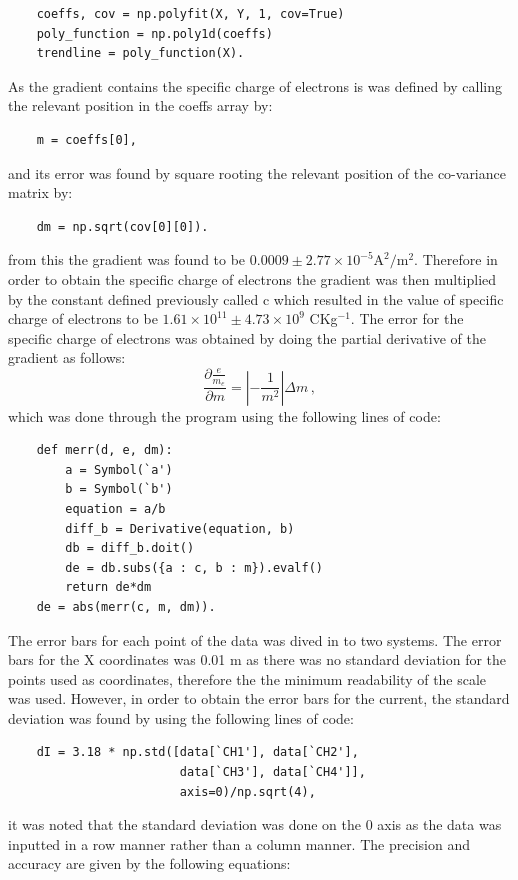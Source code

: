 \documentclass[12pt, a4paper]{article}
\begin{document}
\begin{lstlisting}
    coeffs, cov = np.polyfit(X, Y, 1, cov=True)
    poly_function = np.poly1d(coeffs)
    trendline = poly_function(X).
\end{lstlisting}
As the gradient contains the specific charge of electrons is was defined by calling the relevant position in the coeffs array by:
\begin{lstlisting}
    m = coeffs[0],
\end{lstlisting}
and its error was found by square rooting the relevant position of the co-variance matrix by:
\begin{lstlisting}
    dm = np.sqrt(cov[0][0]).
\end{lstlisting}
from this the gradient was found to be $0.0009 \pm 2.77\times10^{-5}\mathrm{ A}^2/\mathrm{m}^2$. Therefore in order to obtain the specific charge of electrons the gradient was then multiplied by the constant defined previously called c which resulted in the value of specific charge of electrons to be $1.61\times10^{11} \pm 4.73\times10^9$ CKg$^{-1}$. The error for the specific charge of electrons was obtained by doing the partial derivative of the gradient as follows:
\begin{equation*}
    \frac{\partial\frac{e}{m_e}}{\partial m}=\left|{-\frac{1}{m^2}}\right|\Delta m\,,
\end{equation*}
which was done through the program using the following lines of code:
\begin{lstlisting}
    def merr(d, e, dm):
        a = Symbol(`a')
        b = Symbol(`b')
        equation = a/b
        diff_b = Derivative(equation, b)
        db = diff_b.doit()
        de = db.subs({a : c, b : m}).evalf()
        return de*dm
    de = abs(merr(c, m, dm)).
\end{lstlisting}
The error bars for each point of the data was dived in to two systems. The error bars for the X coordinates was 0.01 m as there was no standard deviation for the points used as coordinates, therefore the the minimum readability of the scale was used. However, in order to obtain the error bars for the current, the standard deviation was found by using the following lines of code:
\begin{lstlisting}
    dI = 3.18 * np.std([data[`CH1'], data[`CH2'], 
                        data[`CH3'], data[`CH4']],
                        axis=0)/np.sqrt(4),
\end{lstlisting}
it was noted that the standard deviation was done on the 0 axis as the data was inputted in a row manner rather than a column manner. The precision and accuracy are given by the following equations:
\end{document}
